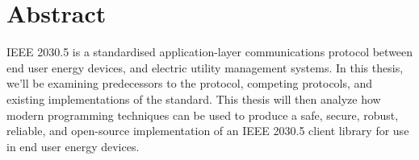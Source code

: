 \chapter*{Abstract}\label{abstract}
IEEE 2030.5 is a standardised application-layer communications protocol between end user energy devices, and electric utility management systems.
In this thesis, we'll be examining predecessors to the protocol, competing protocols, and existing implementations of the standard.
This thesis will then analyze how modern programming techniques can be used to produce a safe, secure, robust, reliable, and open-source implementation of an IEEE 2030.5 client library for use in end user energy devices.
